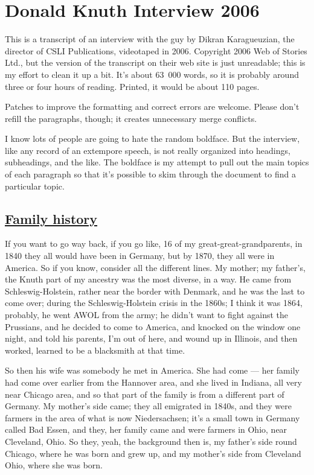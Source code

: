 \documentclass[]{article}
\date{}
\begin{document}
\section{Donald Knuth Interview 2006}\label{donald-knuth-interview-2006}

This is a transcript of an interview with the guy by Dikran
Karagueuzian, the director of CSLI Publications, videotaped in 2006.
Copyright 2006 Web of Stories Ltd., but the version of the transcript on
their web site is just unreadable; this is my effort to clean it up a
bit. It's about 63~000 words, so it is probably around three or four
hours of reading. Printed, it would be about 110 pages.

Patches to improve the formatting and correct errors are welcome. Please
don't refill the paragraphs, though; it creates unnecessary merge
conflicts.

I know lots of people are going to hate the random boldface. But the
interview, like any record of an extempore speech, is not really
organized into headings, subheadings, and the like. The boldface is my
attempt to pull out the main topics of each paragraph so that it's
possible to skim through the document to find a particular topic.

\subsection{\texorpdfstring{\href{http://webofstories.com/play/17060}{Family
history}}{Family history}}\label{family-history}

If you want to go way back, if you go like, 16 of my
great-great-grandparents, in 1840 they all would have been in Germany,
but by 1870, they all were in America. So if you know, consider all the
different lines. My mother; my father's, the Knuth part of my ancestry
was the most diverse, in a way. He came from Schleswig-Holstein, rather
near the border with Denmark, and he was the last to come over; during
the Schleswig-Holstein crisis in the 1860s; I think it was 1864,
probably, he went AWOL from the army; he didn't want to fight against
the Prussians, and he decided to come to America, and knocked on the
window one night, and told his parents, I'm out of here, and wound up in
Illinois, and then worked, learned to be a blacksmith at that time.

So then his wife was somebody he met in America. She had come --- her
family had come over earlier from the Hannover area, and she lived in
Indiana, all very near Chicago area, and so that part of the family is
from a different part of Germany. My mother's side came; they all
emigrated in 1840s, and they were farmers in the area of what is now
Niedersachsen; it's a small town in Germany called Bad Essen, and they,
her family came and were farmers in Ohio, near Cleveland, Ohio. So they,
yeah, the background then is, my father's side round Chicago, where he
was born and grew up, and my mother's side from Cleveland Ohio, where
she was born.
\end{document}
